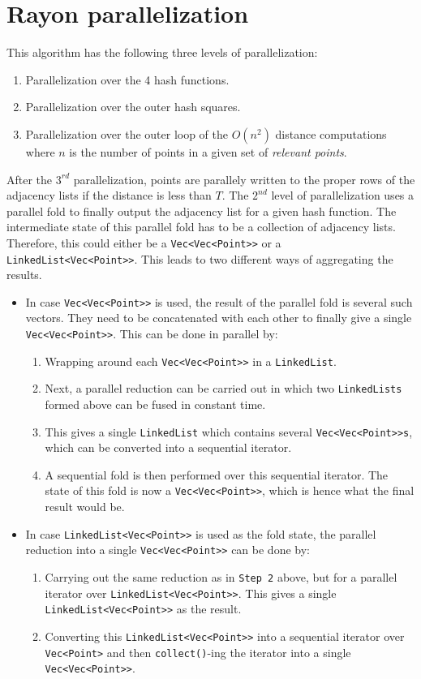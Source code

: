 \section{Rayon parallelization}
This algorithm has the following three levels of parallelization:
\begin{enumerate}
\item Parallelization over the 4 hash functions.
\item Parallelization over the outer hash squares.
\item Parallelization over the outer loop of the $O(n^2)$ distance computations where $n$ is the number of points in a given set of \emph{relevant points}.
\end{enumerate}
After the $3^{rd}$ parallelization, points are parallely written to the proper rows of the adjacency lists if the distance is less than $T$.
The $2^{nd}$ level of parallelization uses a parallel fold to finally output the adjacency list for a given hash function.
The intermediate state of this parallel fold has to be a collection of adjacency lists. Therefore, this could either be a \texttt{Vec<Vec<Point>>} or a \texttt{LinkedList<Vec<Point>>}. This leads to two different ways of aggregating the results.
\begin{itemize}
    \item In case \texttt{Vec<Vec<Point>>} is used, the result of the parallel fold is several such vectors. They need to be concatenated with each other to finally give a single \texttt{Vec<Vec<Point>>}. This can be done in parallel by:
        \begin{enumerate}
        \item Wrapping around each \texttt{Vec<Vec<Point>>} in a \texttt{LinkedList}.
        \item Next, a parallel reduction can be carried out in which two \texttt{LinkedLists} formed above can be fused in constant time.
        \item This gives a single \texttt{LinkedList} which contains several \texttt{Vec<Vec<Point>>s}, which can be converted into a sequential iterator.
        \item A sequential fold is then performed over this sequential iterator. The state of this fold is now a \texttt{Vec<Vec<Point>>}, which is hence what the final result would be.
        \end{enumerate}
    \item In case \texttt{LinkedList<Vec<Point>>} is used as the fold state, the parallel reduction into a single \texttt{Vec<Vec<Point>>} can be done by:
        \begin{enumerate}
            \item Carrying out the same reduction as in \texttt{Step 2} above, but for a parallel iterator over \texttt{LinkedList<Vec<Point>>}. This gives a single \texttt{LinkedList<Vec<Point>>} as the result.
            \item Converting this \texttt{LinkedList<Vec<Point>>} into a sequential iterator over \texttt{Vec<Point>} and then \texttt{collect()}-ing the iterator into a single \texttt{Vec<Vec<Point>>}.
        \end{enumerate}
\end{itemize}
